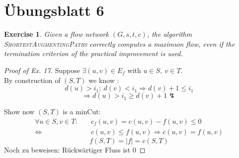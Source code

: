 \documentclass[12pt,oneside,a4paper,parskip=on,fleqn]{scrartcl}
\newcounter{excnt}
\newtheorem{exer}[excnt]{Exercise}
\begin{document}
\section*{Übungsblatt 6}
	\setcounter{excnt}{16}
	\begin{exer}
		Given a flow network $(G,s,t,c)$, the algorithm \textsc{ShortestAugmentingPaths} correctly computes a maximum flow, even if the termination criterion of the practical improvement is used.
	\end{exer}
	\begin{proof}[Proof of Ex. 17]
		Suppose $\exists (u,v) \in E_f$ with $u\in S,\ v\in T$.\\
		By construction of $(S,T)$ we know :
\[
	d(u) > i_1;\ d(v) < i_1 \Rightarrow d(v) + 1 \leq i_1
\]
\[
	\Rightarrow d(u) > i_1 \geq d(v) + 1 \lightning
\]

Show now $(S,T)$ is a minCut:
\begin{align*}
	\forall u\in S, v\in T:\quad& c_f(u,v) = c(u,v) - f(u,v) \leq 0\\
	\Leftrightarrow &c(u,v) \leq f(u,v) \Rightarrow c(u,v) = f(u,v)
\end{align*}
\[
	f(S,T) = |f| = c(S,T)
\]
Noch zu beweisen: Rückwärtiger Fluss ist 0
	\end{proof}
\end{document}
